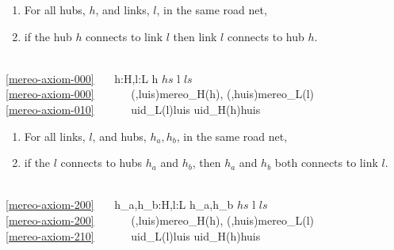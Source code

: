 {\begin{enumerate}\setei
\item \label{mereo-axiom-000} For all hubs, $h$, and links, $l$, in the same road net,
\item \label{mereo-axiom-010} if the hub $h$ connects to link $l$ \nyl
  then link $l$ connects to hub $h$. 
\savei\end{enumerate}\footsize\HHHH
\bp
{}\\
\ref{mereo-axiom-000}\ \ \ {\ALL} h:H,l:L {\RDOT} h {\ISIN} $hs$ {\WEDGE} l {\ISIN} $ls$ {\DBLRIGHTARROW}\\
\ref{mereo-axiom-000}\ \ \ \ \ \  ({\UNDERLINE},luis){\EQ}mereo\_H(h), ({\UNDERLINE},huis){\EQ}mereo\_L(l)\\
\ref{mereo-axiom-010}\ \ \ \ \ \  uid\_L(l){\ISIN}luis {\IS} uid\_H(h){\ISIN}huis  
\ep
\pos{\psno}{\mnewfoil}
\HHHH
\vspace*{2mm}
\begin{enumerate}\setei
\item \label{mereo-axiom-200} For all links, $l$, and hubs, $h_a, h_b$, in the same road net,
\item \label{mereo-axiom-210} if the $l$ connects to hubs $h_a$
  and $h_b$, \nyl then  $h_a$ and $h_b$ both connects to link $l$.
\savei\end{enumerate}\footsize\HHHH
\bp
{}\\
\ref{mereo-axiom-200}\ \ \ {\ALL} h\_a,h\_b:H,l:L {\RDOT} {\LBRACE}h\_a,h\_b{\RBRACE} {\SUBSETEQ} $hs$ {\WEDGE} l {\ISIN} $ls$ {\DBLRIGHTARROW}\\
\ref{mereo-axiom-200}\ \ \ \ \ \  ({\UNDERLINE},luis){\EQ}mereo\_H(h), ({\UNDERLINE},huis){\EQ}mereo\_L(l)\\
\ref{mereo-axiom-210}\ \ \ \ \ \  uid\_L(l){\ISIN}luis {\IS} uid\_H(h){\ISIN}huis \ \ \eod
\ep
}



